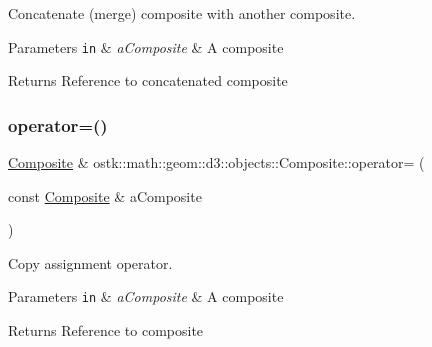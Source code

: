 Concatenate (merge) composite with another composite.


\begin{DoxyParams}[1]{Parameters}
\mbox{\tt in}  & {\em a\+Composite} & A composite \\
\hline
\end{DoxyParams}
\begin{DoxyReturn}{Returns}
Reference to concatenated composite 
\end{DoxyReturn}
\mbox{\label{classostk_1_1math_1_1geom_1_1d3_1_1objects_1_1_composite_a0e0a4a03302ae92926d8f4a94a3b1291}} 
\subsubsection{\texorpdfstring{operator=()}{operator=()}}
{\footnotesize\ttfamily \hyperlink{classostk_1_1math_1_1geom_1_1d3_1_1objects_1_1_composite}{Composite} \& ostk\+::math\+::geom\+::d3\+::objects\+::\+Composite\+::operator= (\begin{DoxyParamCaption}\item[{const \hyperlink{classostk_1_1math_1_1geom_1_1d3_1_1objects_1_1_composite}{Composite} \&}]{a\+Composite }\end{DoxyParamCaption})}



Copy assignment operator. 


\begin{DoxyParams}[1]{Parameters}
\mbox{\tt in}  & {\em a\+Composite} & A composite \\
\hline
\end{DoxyParams}
\begin{DoxyReturn}{Returns}
Reference to composite 
\end{DoxyReturn}
\mbox{\label{classostk_1_1math_1_1geom_1_1d3_1_1objects_1_1_composite_aa41f70a711077a4b59937fddef380150}} 

